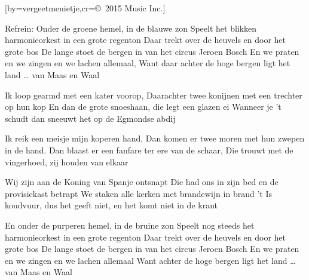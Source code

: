  

[by=vergeetmenietje,cr={\copyright~2015 Music Inc.}]




\beginchorus
Refrein:
Onder de groene hemel, in de blauwe zon
Speelt het blikken harmonieorkest in een grote regenton
Daar trekt over de heuvels en door het grote bos
De lange stoet de bergen in van het circus Jeroen Bosch
En we praten en we zingen en we lachen allemaal,
Want daar achter de hoge bergen ligt het land …
van Maas en Waal
\endchorus


\beginverse
Ik loop gearmd met een kater voorop,
Daarachter twee konijnen met een trechter op hun kop
En dan de grote snoeshaan, die legt een glazen ei
Wanneer je 't schudt dan sneeuwt het op de Egmondse abdij
\endverse

\beginverse
Ik reik een meisje mijn koperen hand,
Dan komen er twee moren met hun zwepen in de hand.
Dan blaast er een fanfare ter ere van de schaar,
Die trouwt met de vingerhoed, zij houden van elkaar
\endverse

\beginverse
Wij zijn aan de Koning van Spanje ontsnapt
Die had ons in zijn bed en de provisiekast betrapt
We staken alle kerken met brandewijn in brand
't Is koudvuur, dus het geeft niet, en het komt niet in de krant
\endverse

\beginchorus
En onder de purperen hemel, in de bruine zon
Speelt nog steeds het harmonieorkest in een grote regenton
Daar trekt over de heuvels en door het grote bos
De lange stoet de bergen in van het circus Jeroen Bosch
En we praten en we zingen en we lachen allemaal
Want achter de hoge bergen ligt het land … van Maas en Waal 
\endchorus




\endsong
